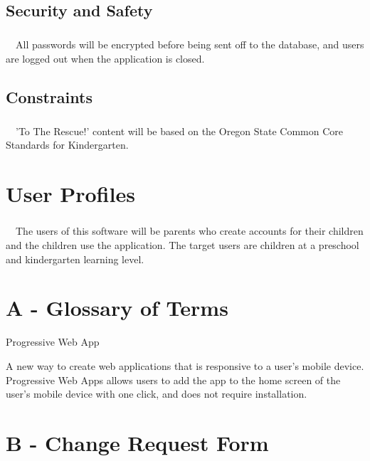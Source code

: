 \documentclass[12pt]{report}
\begin{document}
	\section{Security and Safety}
		\paragraph{}\ \ All passwords will be encrypted before being sent off to the database, and users are logged out when the application is closed. 
	\section{Constraints}
		\paragraph{}\ \ 'To The Rescue!' content will be based on the Oregon State Common Core Standards for Kindergarten.
\chapter{User Profiles}	
	\paragraph{}\ \ The users of this software will be parents who create accounts for their children and the children use the application. The target users are children at a preschool and kindergarten learning level.
	
\newpage
\appendix
\chapter{A - Glossary of Terms} 
\small
\label{App:AppendixA}
\thispagestyle{fancy}	
	
	\begin{labeling}{Progressive Web App}
		\item [Progressive Web App] A new way to create web applications that is responsive to a user's mobile device. Progressive Web Apps allows users to add the app to the home screen of the user's mobile device with one click, and does not require installation. 
	\end{labeling}
	
	
\newpage
\appendix
\chapter{B - Change Request Form} 
\small
\label{App:AppendixB}
\thispagestyle{fancy}	
	
\end{document}
